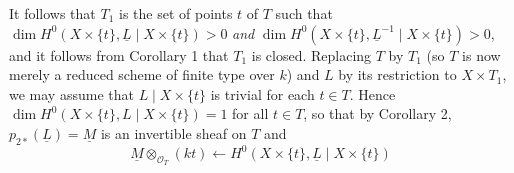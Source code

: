 It follows that $T_1$ is the set of points $t$ of $T$ such that
$\dim H^0(X \times \{t\}, \underline{L} \mid X \times \{t\}) > 0$
\textit{and}
$\dim H^0(X \times \{t\}, \underline{L}^{-1} \mid X \times \{t\}) > 0$, and
it follows from Corollary 1 that $T_1$ is closed. Replacing $T$ by $T_1$ (so
$T$ is now merely a reduced scheme of finite type over $k$) and $L$ by its
restriction to $X \times T_1$, we may assume that $L \mid X \times \{t\}$ is
trivial for each $t \in T$. Hence
$\dim H^0(X \times \{t\}, L \mid X \times \{t\}) = 1$ for all $t \in T$, so
that by Corollary 2, $p_{2*}(\underline{L}) = \underline{M}$ is an invertible
sheaf on $T$ and
\[
  \underline{M} \otimes_{\mathcal{O}_T} (kt) \leftarrow
  H^0(X \times \{t\}, \underline{L} \mid X \times \{t\})
\]
